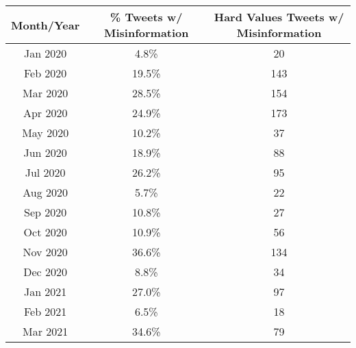 \documentclass[fontsize=11pt]{article}
\begin{document}
    \begin{tabular}{|c|c|c|}
        \hline
        \textbf{Month/Year} & \textbf{\% Tweets w/ Misinformation} & \textbf{Hard Values Tweets w/ Misinformation} \\
        \hline
        Jan 2020            & 4.8\%                                & 20                                            \\
        Feb 2020            & 19.5\%                               & 143                                           \\
        Mar 2020            & 28.5\%                               & 154                                           \\
        Apr 2020            & 24.9\%                               & 173                                           \\
        May 2020            & 10.2\%                               & 37                                            \\
        Jun 2020            & 18.9\%                               & 88                                            \\
        Jul 2020            & 26.2\%                               & 95                                            \\
        Aug 2020            & 5.7\%                                & 22                                            \\
        Sep 2020            & 10.8\%                               & 27                                            \\
        Oct 2020            & 10.9\%                               & 56                                            \\
        Nov 2020            & 36.6\%                               & 134                                           \\
        Dec 2020            & 8.8\%                                & 34                                            \\
        Jan 2021            & 27.0\%                               & 97                                            \\
        Feb 2021            & 6.5\%                                & 18                                            \\
        Mar 2021            & 34.6\%                               & 79                                            \\

\end{tabular}
\end{document}
